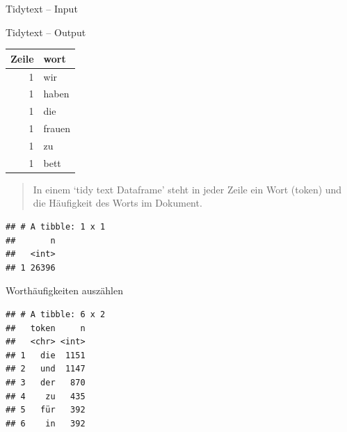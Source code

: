 \begin{frame}[fragile]{Tidytext -- Input}

\begin{Shaded}
\begin{Highlighting}[]
\StringTok{ }\NormalTok{(}\NormalTok{, }\NormalTok{, }
    \NormalTok{, }\NormalTok{)}
\StringTok{ }\NormalTok{(} \OperatorTok{:}\NormalTok{, }
\end{Highlighting}
\end{Shaded}

\end{frame}

\begin{frame}[fragile]{Tidytext -- Output}

\begin{longtable}[]{@{}rl@{}}
\toprule
Zeile & wort\tabularnewline
\midrule
\endhead
1 & wir\tabularnewline
1 & haben\tabularnewline
1 & die\tabularnewline
1 & frauen\tabularnewline
1 & zu\tabularnewline
1 & bett\tabularnewline
\bottomrule
\end{longtable}

\begin{quote}
In einem `tidy text Dataframe' steht in jeder Zeile ein Wort (token) und
die Häufigkeit des Worts im Dokument.
\end{quote}

\begin{verbatim}
## # A tibble: 1 x 1
##       n
##   <int>
## 1 26396
\end{verbatim}

\end{frame}

\begin{frame}[fragile]{Worthäufigkeiten auszählen}

\begin{Shaded}
\end{Shaded}

\begin{verbatim}
## # A tibble: 6 x 2
##   token     n
##   <chr> <int>
## 1   die  1151
## 2   und  1147
## 3   der   870
## 4    zu   435
## 5   für   392
## 6    in   392
\end{verbatim}

\end{frame}

